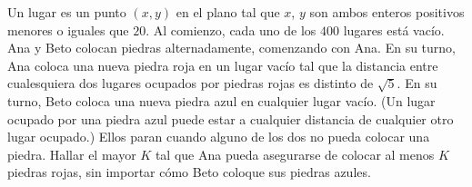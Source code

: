 Un lugar es un punto $(x,y)$ en el plano tal que $x$, $y$ son ambos enteros positivos menores o iguales que $20$.
Al comienzo, cada uno de los $400$ lugares está vacío. Ana y Beto colocan piedras alternadamente, comenzando con Ana. En su turno, Ana coloca una nueva piedra roja en un lugar vacío tal que la
distancia entre cualesquiera dos lugares ocupados por piedras rojas es distinto de $\sqrt{5}$. En su turno, Beto coloca una nueva piedra azul en cualquier lugar vacío. (Un lugar ocupado por una piedra azul puede estar a cualquier distancia de cualquier otro lugar ocupado.) Ellos paran cuando alguno de los dos no pueda colocar una piedra.
Hallar el mayor $K$ tal que Ana pueda asegurarse de colocar al menos $K$ piedras rojas, sin importar cómo Beto coloque sus piedras azules.